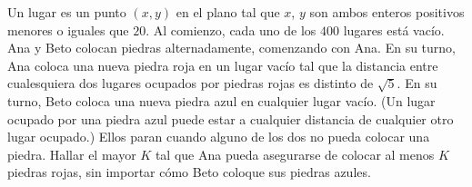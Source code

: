 Un lugar es un punto $(x,y)$ en el plano tal que $x$, $y$ son ambos enteros positivos menores o iguales que $20$.
Al comienzo, cada uno de los $400$ lugares está vacío. Ana y Beto colocan piedras alternadamente, comenzando con Ana. En su turno, Ana coloca una nueva piedra roja en un lugar vacío tal que la
distancia entre cualesquiera dos lugares ocupados por piedras rojas es distinto de $\sqrt{5}$. En su turno, Beto coloca una nueva piedra azul en cualquier lugar vacío. (Un lugar ocupado por una piedra azul puede estar a cualquier distancia de cualquier otro lugar ocupado.) Ellos paran cuando alguno de los dos no pueda colocar una piedra.
Hallar el mayor $K$ tal que Ana pueda asegurarse de colocar al menos $K$ piedras rojas, sin importar cómo Beto coloque sus piedras azules.